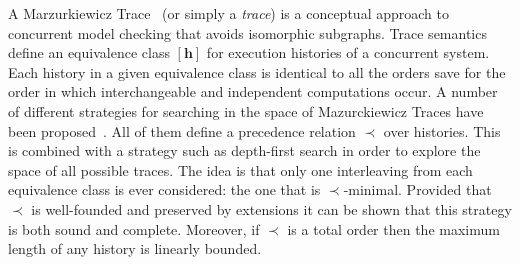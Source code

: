 

A Marzurkiewicz Trace~\citep{mazurkiewicz86} (or simply a \emph{trace}) is a conceptual approach to
concurrent model checking that avoids isomorphic subgraphs.  Trace semantics define an equivalence
class $[\mathbf h]$ for execution histories of a concurrent system. Each history in a given
equivalence class is identical to all the orders save for the order in which interchangeable and
independent computations occur.  A number of different strategies for searching in the space of
Mazurckiewicz Traces have been proposed~\citep{esparza08}. All of them define a precedence relation
$\prec$ over histories. This is combined with a strategy such as depth-first search in order to
explore the space of all possible traces.  The idea is that only one interleaving from each
equivalence class is ever considered: the one that is $\prec$-minimal.  Provided that $\prec$ is
well-founded and preserved by extensions it can be shown that this strategy is both sound and
complete.  Moreover, if $\prec$ is a total order then the maximum length of any history is linearly
bounded.

